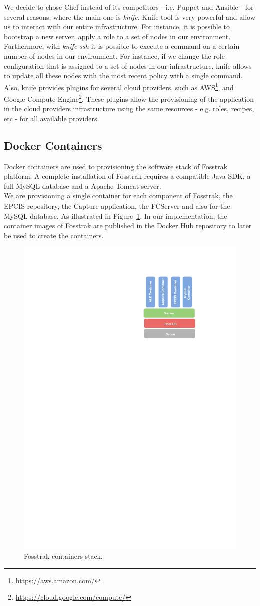 We decide to chose Chef instead of its competitors - i.e. Puppet and Ansible - for several
reasons, where the main one is \textit{knife}. Knife tool is very powerful and allow us to
interact with our entire infrastructure. For instance, it is possible to bootstrap a new server,
apply a role to a set of nodes in our environment. Furthermore, with \textit{knife ssh} it is possible
to execute a command on a certain number of nodes in our environment. For instance, if we change
the role configuration that is assigned to a set of nodes in our infrastructure, knife allows to
update all these nodes with the most recent policy with a single command.\\

Also, knife provides plugins for several cloud providers, such as \gls{AWS}\footnote{\url{https://aws.amazon.com/}},
and Google Compute Engine\footnote{\url{https://cloud.google.com/compute/}}. These plugins allow
the provisioning of the application in the cloud providers infrastructure using the same resources - e.g.
roles, recipes, etc - for all available providers.

\subsection{Docker Containers}
\label{sub:impl_docker}
Docker containers are used to provisioning the software stack of Fosstrak platform. A complete
installation of Fosstrak requires a compatible Java \gls{SDK}, a full MySQL database and a Apache Tomcat
server.\\

We are provisioning a single container for each component of Fosstrak, the \gls{EPCIS} repository,
the Capture application, the \gls{FCServer} and also for the MySQL database, As illustrated in Figure~\ref{fig:impl_containers}.
In our implementation, the container images of Fosstrak are published in the Docker Hub repository
to later be used to create the containers.\\

\begin{figure}[!ht]
  \centering
  \includegraphics[width=.3\textwidth]{./images/docker-stack}
  \caption[Fosstrak containers stack.]{Fosstrak containers stack.}
  \label{fig:impl_containers}
\end{figure}

